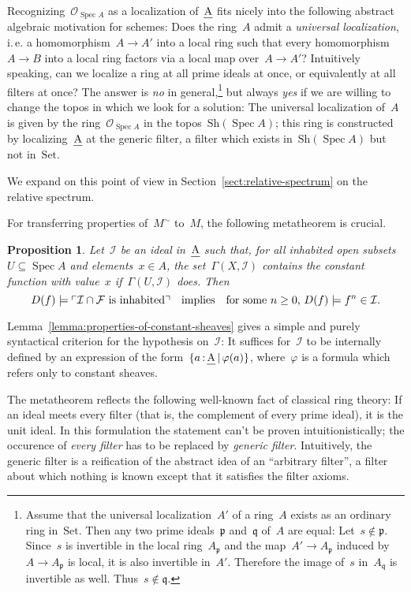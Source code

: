 \documentclass[10pt,reqno,a4paper]{amsbook}
\makeatletter
\theoremstyle{definition}
\theoremstyle{plain}
\newtheorem{prop}[defn]{Proposition}
\theoremstyle{remark}
\newcommand{\F}{\mathcal{F}}
\renewcommand{\O}{\mathcal{O}}
\newcommand{\I}{\mathcal{I}}
\newcommand{\ppp}{\mathfrak{p}}
\newcommand{\qqq}{\mathfrak{q}}
\let\oldul\ul
\renewcommand{\ul}[1]{\text{\oldul{$#1$}}}
\newcommand{\Set}{\mathrm{Set}}
\newcommand{\Sh}{\mathrm{Sh}}
\DeclareMathOperator{\Spec}{Spec}
\newcommand{\?}{\,{:}\,}
\renewcommand{\_}{\mathpunct{.}\,}
\newcommand{\speak}[1]{\ulcorner\text{\textnormal{#1}}\urcorner}
\newcommand{\ie}{i.\,e.\@\xspace}
\makeatother
\begin{document}
Recognizing~$\O_{\Spec A}$ as a localization of~$\ul{A}$ fits nicely into the
following abstract algebraic motivation for schemes: Does the ring~$A$ admit a
\emph{universal localization}, \ie a homomorphism~$A \to A'$ into a local ring
such that every homomorphism~$A \to B$ into a local ring factors via a local
map over~$A \to A'$? Intuitively speaking, can we localize a ring at all prime
ideals at once, or equivalently at all filters at once? The answer is \emph{no}
in general,\footnote{Assume that the universal localization~$A'$ of a ring~$A$ exists as an ordinary ring in~$\Set$. Then any
two prime ideals~$\ppp$ and~$\qqq$ of~$A$ are equal: Let~$s \not\in \ppp$.
Since~$s$ is invertible in the local ring~$A_\ppp$ and the map~$A' \to A_\ppp$
induced by~$A \to A_\ppp$ is local, it is also invertible in~$A'$. Therefore the image of~$s$ in~$A_\qqq$ is
invertible as well. Thus~$s \not\in \qqq$.} but always \emph{yes} if we are
willing to change the topos in which we look for a solution: The universal
localization of~$A$ is given by the ring~$\O_{\Spec A}$ in the topos~$\Sh(\Spec
A)$; this ring is constructed by localizing~$\ul{A}$ at the generic
filter, a filter which exists in~$\Sh(\Spec A)$ but not in~$\Set$.

We expand on this point of view in Section~\ref{sect:relative-spectrum} on the
relative spectrum.

For transferring properties of~$M^\sim$ to~$M$, the following metatheorem is
crucial.
\begin{prop}\label{prop:metaproperty-of-the-generic-filter}
Let~$\I$ be an ideal in~$\ul{A}$ such that, for all inhabited
open subsets~$U \subseteq \Spec A$ and elements~$x \in A$, the set~$\Gamma(X,\I)$
contains the constant function with value~$x$ if~$\Gamma(U,\I)$ does. Then
\[ D(f) \models \speak{$\I \cap \F$ is inhabited}
  \quad\text{implies}\quad
  \text{for some~$n \geq 0$, $D(f) \models f^n \in \I$.} \]
\end{prop}

Lemma~\ref{lemma:properties-of-constant-sheaves} gives a simple and purely
syntactical criterion for the hypothesis on~$\I$: It suffices for~$\I$ to be
internally defined by an expression of the form~$\{ a\?\ul{A} \,|\, \varphi(a)
\}$, where~$\varphi$ is a formula which refers only to constant sheaves.

The metatheorem reflects the following well-known fact of classical
ring theory: If an ideal meets every filter (that is, the complement of every
prime ideal), it is the unit ideal. In this formulation the statement can't be
proven intuitionistically; the occurence of \emph{every filter} has to be
replaced by \emph{generic filter}. Intuitively, the generic filter is a
reification of the abstract idea of an ``arbitrary filter'', a filter about
which nothing is known except that it satisfies the filter axioms.
\end{document}
